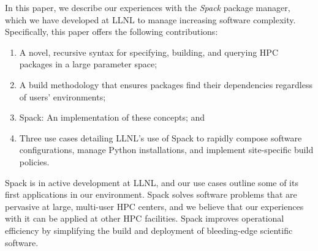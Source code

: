 In this paper, we describe our experiences with the {\it Spack} package manager,
which we have developed at LLNL to manage increasing software complexity.
Specifically, this paper offers the following contributions:
\begin{enumerate}
\item A novel, recursive syntax for specifying, building, and querying
      HPC packages in a large parameter space;
\item A build methodology that ensures packages find their dependencies
      regardless of users' environments; 
\item Spack: An implementation of these concepts; and
\item Three use cases detailing LLNL's use of Spack to rapidly compose
      software configurations, manage Python installations, and implement
      site-specific build policies.
\end{enumerate}

Spack is in active development at LLNL, and our use cases outline some of
its first applications in our environment.  Spack solves software problems 
that are pervasive at large, multi-user HPC centers, and we believe that our
experiences with it can be applied at other HPC facilities.  Spack improves
operational efficiency by simplifying the build and deployment of 
bleeding-edge scientific software.